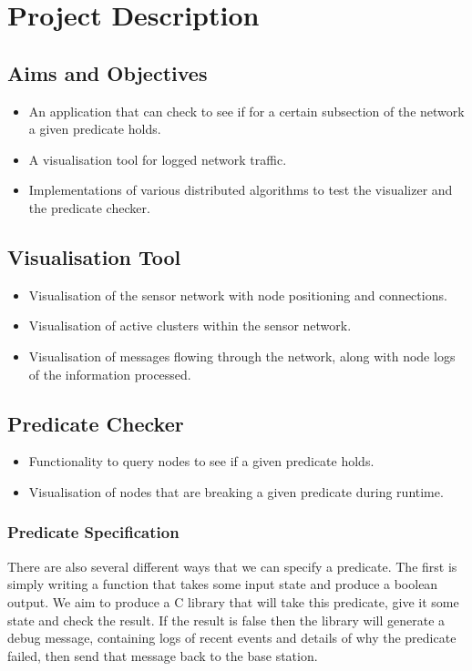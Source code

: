 \documentclass[a4paper]{article}
\begin{document}
\section{Project Description}

\subsection{Aims and Objectives}
\begin{itemize}
	\item An application that can check to see if for a certain subsection of the network a given predicate holds.
	\item A visualisation tool for logged network traffic.
	\item Implementations of various distributed algorithms to test the visualizer and the predicate checker.
\end{itemize}

\subsection{Visualisation Tool}
\begin{itemize}
	\item Visualisation of the sensor network with node positioning and connections.
	\item Visualisation of active clusters within the sensor network.
	\item Visualisation of messages flowing through the network, along with node logs of the information processed.
\end{itemize}

\subsection{Predicate Checker}
\begin{itemize}
	\item Functionality to query nodes to see if a given predicate holds.
	\item Visualisation of nodes that are breaking a given predicate during runtime.
\end{itemize}

\subsubsection{Predicate Specification}

There are also several different ways that we can specify a predicate. The first is simply writing a function that takes some input state and produce a boolean output. We aim to produce a C library that will take this predicate, give it some state and check the result. If the result is false then the library will generate a debug message, containing logs of recent events and details of why the predicate failed, then send that message back to the base station.
\end{document}
